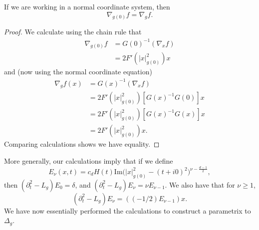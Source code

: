 \begin{lemma}
    If we are working in a normal coordinate system, then
    \[ \nabla_{g(0)} f = \nabla_g f. \]
\end{lemma}
\begin{proof}
    We calculate using the chain rule that
    \begin{align*}
        \nabla_{g(0)} f &= G(0)^{-1} (\nabla_x f)\\
        &= 2 F'(|x|^2_{g(0)}) x
    \end{align*}
    and (now using the normal coordinate equation)
    \begin{align*}
        \nabla_g f(x) &= G(x)^{-1} (\nabla_x f)\\
        &= 2 F'(|x|^2_{g(0)}) [G(x)^{-1} G(0)] x\\
        &= 2 F'(|x|^2_{g(0)}) [G(x)^{-1} G(x)] x\\
        &= 2 F'(|x|^2_{g(0)}) x.
    \end{align*}
    Comparing calculations shows we have equality.
\end{proof}

More generally, our calculations imply that if we define
%
\[ E_\nu(x,t) = c_d H(t) \text{Im} \Big(|x|^2_{g(0)} - (t + i0)^2 \Big)^{\nu - \frac{d-1}{2}}, \]
%
then $(\partial_t^2 - L_g) E_0 = \delta$, and $(\partial_t^2 - L_g) E_\nu = \nu E_{\nu-1}$. We also have that for $\nu \geq 1$,
%
\[ (\partial_t^2 - L_g) E_\nu = ( (-1/2) E_{\nu-1} ) x. \]
%
We have now essentially performed the calculations to construct a parametrix to $\Delta_g$.

%
%
%
%

%
%

%
%
%

